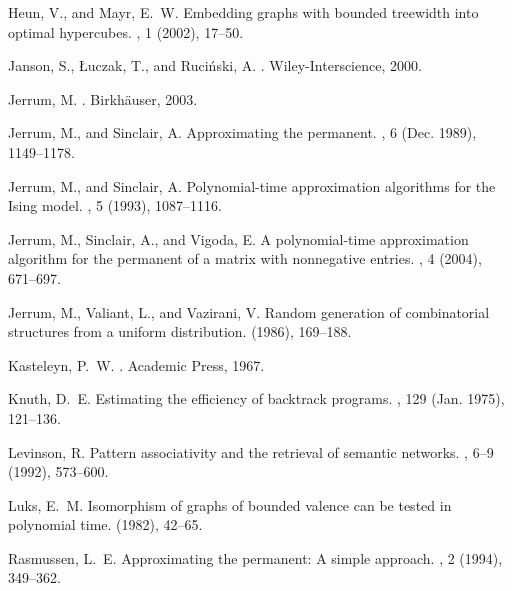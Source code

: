 \documentclass[11pt]{article}
\begin{document}
\begin{thebibliography}{10}
{\sc Heun, V., and Mayr, E.~W.}
\newblock Embedding graphs with bounded treewidth into optimal hypercubes.
, 1 (2002), 17--50.

{\sc Janson, S., {\L}uczak, T., and Ruci{\'n}ski, A.}
.
\newblock Wiley-Interscience, 2000.

{\sc Jerrum, M.}
.
\newblock Birkh{\"a}user, 2003.

{\sc Jerrum, M., and Sinclair, A.}
\newblock Approximating the permanent.
, 6 (Dec. 1989), 1149--1178.

{\sc Jerrum, M., and Sinclair, A.}
\newblock Polynomial-time approximation algorithms for the {Ising} model.
, 5 (1993), 1087--1116.

{\sc Jerrum, M., Sinclair, A., and Vigoda, E.}
\newblock A polynomial-time approximation algorithm for the permanent of a
  matrix with nonnegative entries.
, 4 (2004), 671--697.

{\sc Jerrum, M., Valiant, L., and Vazirani, V.}
\newblock Random generation of combinatorial structures from a uniform
  distribution.
 (1986), 169--188.

{\sc Kasteleyn, P.~W.}
.
\newblock Academic Press, 1967.

{\sc Knuth, D.~E.}
\newblock Estimating the efficiency of backtrack programs.
, 129 (Jan. 1975), 121--136.

{\sc Levinson, R.}
\newblock Pattern associativity and the retrieval of semantic networks.
, 6--9 (1992),
  573--600.

{\sc Luks, E.~M.}
\newblock Isomorphism of graphs of bounded valence can be tested in polynomial
  time.
 (1982), 42--65.

{\sc Rasmussen, L.~E.}
\newblock Approximating the permanent: {A} simple approach.
, 2 (1994), 349--362.


\end{thebibliography}
\end{document}
